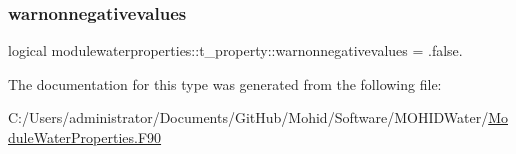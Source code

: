 \subsubsection{\texorpdfstring{warnonnegativevalues}{warnonnegativevalues}}
{\footnotesize\ttfamily logical modulewaterproperties\+::t\+\_\+property\+::warnonnegativevalues = .false.\hspace{0.3cm}{\ttfamily [private]}}



The documentation for this type was generated from the following file\+:\begin{DoxyCompactItemize}
\item 
C\+:/\+Users/administrator/\+Documents/\+Git\+Hub/\+Mohid/\+Software/\+M\+O\+H\+I\+D\+Water/\mbox{\hyperlink{_module_water_properties_8_f90}{Module\+Water\+Properties.\+F90}}\end{DoxyCompactItemize}
